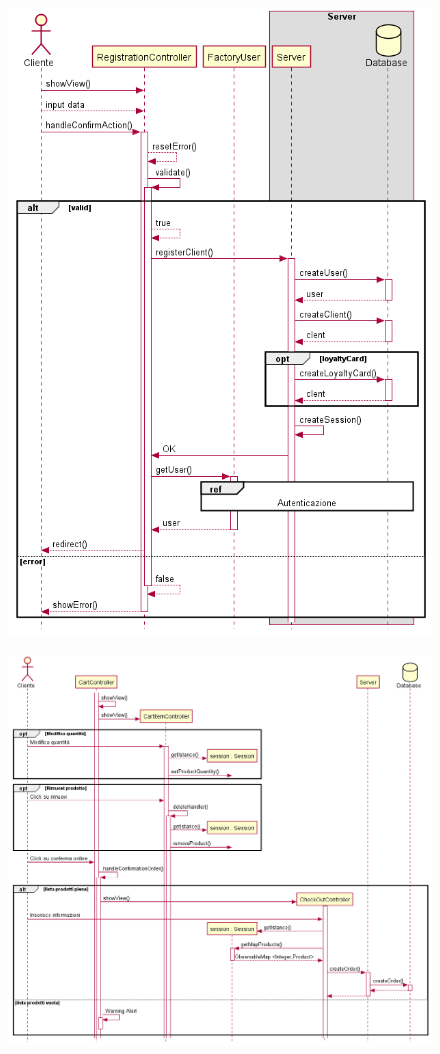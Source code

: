 \documentclass[12pt, a4paper]{report}
\begin{document}
\begin{figure}[H]
  \centering
  \includegraphics[width=\textwidth]{registration_sequence.png}
\end{figure}

\begin{figure}[H]
  \centering
  \includegraphics[width=\textwidth]{sequence_conferma_spesa.png}
\end{figure}
\end{document}
